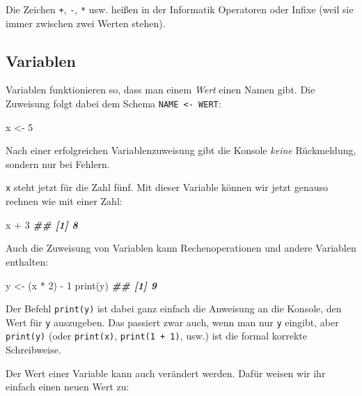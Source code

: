 \documentclass[
  ngerman,
]{article}
\newenvironment{Shaded}{\begin{snugshade}}{\end{snugshade}}
\newcommand{\DecValTok}[1]{\textcolor[rgb]{0.00,0.00,0.81}{#1}}
\newcommand{\DocumentationTok}[1]{\textcolor[rgb]{0.56,0.35,0.01}{\textbf{\textit{#1}}}}
\newcommand{\FunctionTok}[1]{\textcolor[rgb]{0.00,0.00,0.00}{#1}}
\newcommand{\NormalTok}[1]{#1}
\newcommand{\OtherTok}[1]{\textcolor[rgb]{0.56,0.35,0.01}{#1}}
\newcommand{\SpecialCharTok}[1]{\textcolor[rgb]{0.00,0.00,0.00}{#1}}
\begin{document}
Die Zeichen \texttt{+}, \texttt{-}, \texttt{*} usw. heißen in der Informatik Operatoren oder Infixe (weil sie immer zwischen zwei Werten stehen).

\hypertarget{variablen}{%
\subsection{Variablen}\label{variablen}}

Variablen funktionieren so, dass man einem \emph{Wert} einen Namen gibt. Die Zuweisung folgt dabei dem Schema \texttt{NAME\ \textless{}-\ WERT}:

\begin{Shaded}
\begin{Highlighting}[]
\NormalTok{x }\OtherTok{\textless{}{-}} \DecValTok{5}
\end{Highlighting}
\end{Shaded}

Nach einer erfolgreichen Variablenzuweisung gibt die Konsole \emph{keine} Rückmeldung, sondern nur bei Fehlern.

\texttt{x} steht jetzt für die Zahl fünf. Mit dieser Variable können wir jetzt genauso rechnen wie mit einer Zahl:

\begin{Shaded}
\begin{Highlighting}[]
\NormalTok{x }\SpecialCharTok{+} \DecValTok{3}
\DocumentationTok{\#\# [1] 8}
\end{Highlighting}
\end{Shaded}

Auch die Zuweisung von Variablen kann Rechenoperationen und andere Variablen enthalten:

\begin{Shaded}
\begin{Highlighting}[]
\NormalTok{y }\OtherTok{\textless{}{-}}\NormalTok{ (x }\SpecialCharTok{*} \DecValTok{2}\NormalTok{) }\SpecialCharTok{{-}} \DecValTok{1}
\FunctionTok{print}\NormalTok{(y)}
\DocumentationTok{\#\# [1] 9}
\end{Highlighting}
\end{Shaded}

Der Befehl \texttt{print(y)} ist dabei ganz einfach die Anweisung an die Konsole, den Wert für \texttt{y} auszugeben. Das passiert zwar auch, wenn man nur \texttt{y} eingibt, aber \texttt{print(y)} (oder \texttt{print(x)}, \texttt{print(1\ +\ 1)}, usw.) ist die formal korrekte Schreibweise.

Der Wert einer Variable kann auch verändert werden. Dafür weisen wir ihr einfach einen neuen Wert zu:
\end{document}
